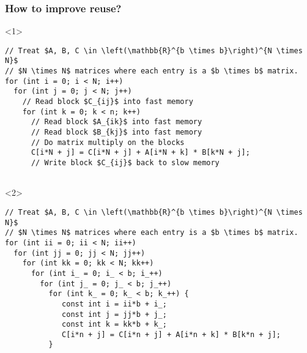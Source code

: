 \documentclass[dvipsnames,presentation,aspectratio=169,14pt]{beamer}
\begin{document}
\begin{frame}[fragile]
  \frametitle{How to improve reuse?}
  \begin{onlyenv}<1>
\begin{verbatim}
// Treat $A, B, C \in \left(\mathbb{R}^{b \times b}\right)^{N \times N}$
// $N \times N$ matrices where each entry is a $b \times b$ matrix.
for (int i = 0; i < N; i++)
  for (int j = 0; j < N; j++)
    // Read block $C_{ij}$ into fast memory
    for (int k = 0; k < n; k++)
      // Read block $A_{ik}$ into fast memory
      // Read block $B_{kj}$ into fast memory
      // Do matrix multiply on the blocks
      C[i*N + j] = C[i*N + j] + A[i*N + k] * B[k*N + j];
      // Write block $C_{ij}$ back to slow memory


\end{verbatim}
  \end{onlyenv}
  \begin{onlyenv}<2>
\begin{verbatim}
// Treat $A, B, C \in \left(\mathbb{R}^{b \times b}\right)^{N \times N}$
// $N \times N$ matrices where each entry is a $b \times b$ matrix.
for (int ii = 0; ii < N; ii++)
  for (int jj = 0; jj < N; jj++)
    for (int kk = 0; kk < N; kk++)
      for (int i_ = 0; i_ < b; i_++)
        for (int j_ = 0; j_ < b; j_++)
          for (int k_ = 0; k_ < b; k_++) {
             const int i = ii*b + i_;
             const int j = jj*b + j_;
             const int k = kk*b + k_;
             C[i*n + j] = C[i*n + j] + A[i*n + k] * B[k*n + j];
          }
\end{verbatim}
  \end{onlyenv}
\end{frame}
\end{document}
